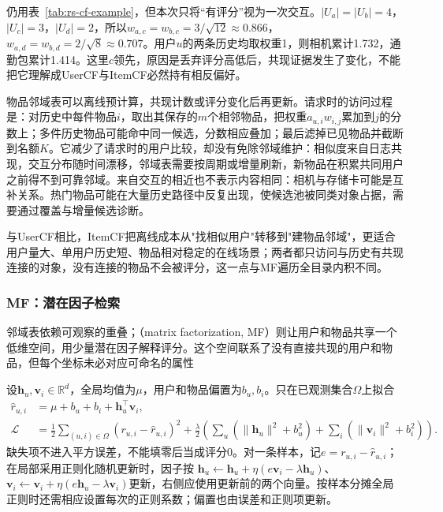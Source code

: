仍用表~\ref{tab:rs-cf-example}，但本次只将“有评分”视为一次交互。$|U_a|=|U_b|=4$，$|U_c|=3$，$|U_d|=2$，所以$w_{a,c}=w_{b,c}=3/\sqrt{12}\approx0.866$，$w_{a,d}=w_{b,d}=2/\sqrt8\approx0.707$。用户$u$的两条历史均取权重1，则相机累计1.732，通勤包累计1.414。这里$c$领先，原因是丢弃评分高低后，共现证据发生了变化，不能把它理解成UserCF与ItemCF必然持有相反偏好。

物品邻域表可以离线预计算，共现计数或评分变化后再更新。请求时的访问过程是：对历史中每件物品$i$，取出其保存的$m$个相邻物品，把权重$a_{u,i}w_{i,j}$累加到$j$的分数上；多件历史物品可能命中同一候选，分数相应叠加；最后滤掉已见物品并截断到名额$K$。它减少了请求时的用户比较，却没有免除邻域维护：相似度来自日志共现，交互分布随时间漂移，邻域表需要按周期或增量刷新，新物品在积累共同用户之前得不到可靠邻域。来自交互的相近也不表示内容相同：相机与存储卡可能是互补关系。热门物品可能在大量历史路径中反复出现，使候选池被同类对象占据，需要通过覆盖与增量候选诊断。

与UserCF相比，ItemCF把离线成本从"找相似用户"转移到"建物品邻域"，更适合用户量大、单用户历史短、物品相对稳定的在线场景；两者都只访问与历史有共现连接的对象，没有连接的物品不会被评分，这一点与MF遍历全目录内积不同。

\subsubsection{MF：潜在因子检索}
\label{sec:rs-mf}

邻域表依赖可观察的重叠；（matrix factorization, MF）则让用户和物品共享一个低维空间，用少量潜在因子解释评分。这个空间联系了没有直接共现的用户和物品，但每个坐标未必对应可命名的属性

设$\bm{h}_u,\bm{v}_i\in\mathbb{R}^d$，全局均值为$\mu$，用户和物品偏置为$b_u,b_i$。只在已观测集合$\Omega$上拟合
\begin{align}
 \widehat r_{u,i}&=\mu+b_u+b_i+\bm{h}_u^\top\bm{v}_i,\\
 \mathcal L&=\frac12\sum_{(u,i)\in\Omega}
  (r_{u,i}-\widehat r_{u,i})^2+
  \frac\lambda2\left(\sum_u(\|\bm h_u\|^2+b_u^2)
  +\sum_i(\|\bm v_i\|^2+b_i^2)\right).
 \label{eq:rs-mf-objective}
\end{align}
缺失项不进入平方误差，不能填零后当成评分0。对一条样本，记$e=r_{u,i}-\widehat r_{u,i}$；在局部采用正则化随机更新时，因子按
$\bm h_u\leftarrow\bm h_u+\eta(e\bm v_i-\lambda\bm h_u)$、
$\bm v_i\leftarrow\bm v_i+\eta(e\bm h_u-\lambda\bm v_i)$更新，右侧应使用更新前的两个向量。按样本分摊全局正则时还需相应设置每次的正则系数；偏置也由误差和正则项更新。

